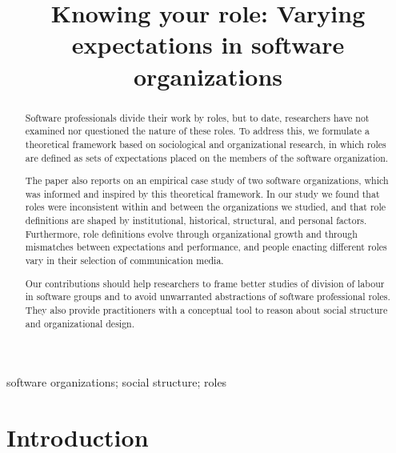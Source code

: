 \documentclass[10pt, conference, compsocconf]{IEEEtran}
\begin{document}
\title{Knowing your role: Varying expectations in software organizations}

\author{
}

\maketitle


\begin{abstract}

Software professionals divide their work by roles, but to date, researchers have not examined nor questioned the nature of these roles. To address this, we formulate a theoretical framework based on sociological and organizational research, in which roles are defined as sets of expectations placed on the members of the software organization.

The paper also reports on an empirical case study of two software organizations, which was informed and inspired by this theoretical framework. In our study we found that roles were inconsistent within and between the organizations we studied, and that role definitions are shaped by institutional, historical, structural, and personal factors. Furthermore, role definitions evolve through organizational growth and through mismatches between expectations and performance, and people enacting different roles vary in their selection of communication media.

Our contributions should help researchers to frame better studies of division of labour in software groups and to avoid unwarranted abstractions of software professional roles. They also provide practitioners with a conceptual tool to reason about social structure and organizational design.

\end{abstract}

\begin{IEEEkeywords}
software organizations; social structure; roles
\end{IEEEkeywords}


\section{Introduction}
\end{document}
